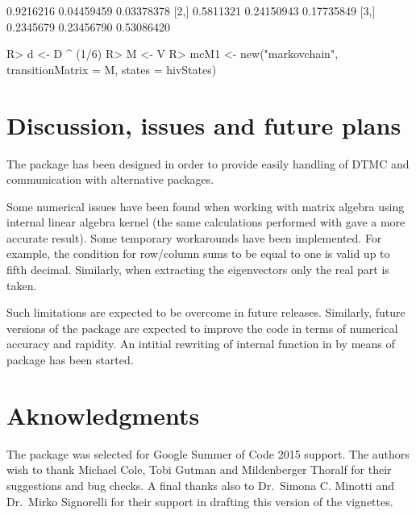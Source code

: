 \documentclass[article,nojss]{jss}
\begin{document}
\begin{CodeChunk}


\begin{CodeOutput}
          [,1]       [,2]       [,3]
[1,] 0.9216216 0.04459459 0.03378378
[2,] 0.5811321 0.24150943 0.17735849
[3,] 0.2345679 0.23456790 0.53086420
\end{CodeOutput}

\begin{CodeInput}
R> d <- D ^ (1/6)
R> M <- V %
R> mcM1 <- new("markovchain", transitionMatrix = M, states = hivStates)
\end{CodeInput}
\end{CodeChunk}

\hypertarget{discussion-issues-and-future-plans}{%
\section{Discussion, issues and future plans}\label{discussion-issues-and-future-plans}}

The  package has been designed in order to provide easily handling of DTMC and communication with alternative packages.

Some numerical issues have been found when working with matrix algebra using  internal linear algebra kernel (the same calculations performed with  gave a more accurate result). Some temporary workarounds have been implemented. For example, the condition for row/column sums to be equal to one is valid up to fifth decimal. Similarly, when extracting the eigenvectors only the real part is taken.

Such limitations are expected to be overcome in future releases. Similarly, future versions of the package are expected to improve the code in terms of numerical accuracy and rapidity. An intitial rewriting of internal function in  by means of  package \citep{RcppR} has been started.

\hypertarget{sec:aknowledgements}{%
\section{Aknowledgments}\label{sec:aknowledgements}}

The package was selected for Google Summer of Code 2015 support. The authors wish to thank Michael Cole, Tobi Gutman and Mildenberger Thoralf for their suggestions and bug checks. A final thanks also to Dr.~Simona C. Minotti and Dr.~Mirko Signorelli for their support in drafting this version of the vignettes.

\clearpage

\renewcommand\refname{References}

\end{document}
